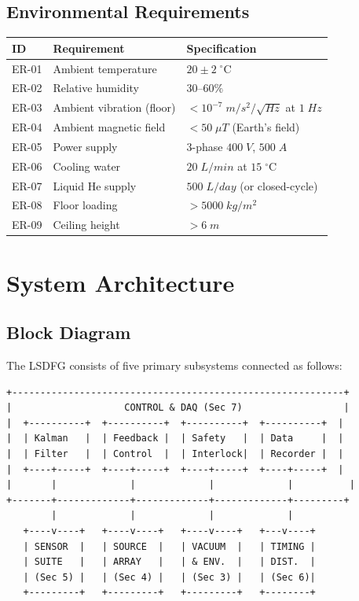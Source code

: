 \documentclass[11pt,a4paper]{article}
\begin{document}
\subsection{Environmental Requirements}

\begin{longtable}{p{}p{}p{}}
\toprule
\textbf{ID} & \textbf{Requirement} & \textbf{Specification} \\
\midrule
\endhead
ER-01 & Ambient temperature & $20 \pm 2\;^\circ$C \\
ER-02 & Relative humidity & $30$--$60\%$ \\
ER-03 & Ambient vibration (floor) & $< 10^{-7}\;\si{m/s^2/\sqrt{Hz}}$
at $1\;\si{Hz}$ \\
ER-04 & Ambient magnetic field & $< 50\;\si{\mu T}$ (Earth's field) \\
ER-05 & Power supply & $3$-phase $400\;\si{V}$, $500\;\si{A}$ \\
ER-06 & Cooling water & $20\;\si{L/min}$ at $15\;^\circ$C \\
ER-07 & Liquid He supply & $500\;\si{L/day}$ (or closed-cycle) \\
ER-08 & Floor loading & $> 5000\;\si{kg/m^2}$ \\
ER-09 & Ceiling height & $> 6\;\si{m}$ \\
\bottomrule
\end{longtable}

\section{System Architecture}

\subsection{Block Diagram}

The LSDFG consists of five primary subsystems connected as follows:

\begin{tcolorbox}[colback=blue!3, colframe=blue!50!black,
title=System Architecture Block Diagram]
\begin{verbatim}
+-----------------------------------------------------------+
|                    CONTROL & DAQ (Sec 7)                  |
|  +----------+  +----------+  +----------+  +----------+  |
|  | Kalman   |  | Feedback |  | Safety   |  | Data     |  |
|  | Filter   |  | Control  |  | Interlock|  | Recorder |  |
|  +----+-----+  +----+-----+  +----+-----+  +----+-----+  |
|       |             |             |             |          |
+-------+-------------+-------------+-------------+---------+
        |             |             |             |
   +----v----+   +----v----+   +----v----+   +---v----+
   | SENSOR  |   | SOURCE  |   | VACUUM  |   | TIMING |
   | SUITE   |   | ARRAY   |   | & ENV.  |   | DIST.  |
   | (Sec 5) |   | (Sec 4) |   | (Sec 3) |   | (Sec 6)|
   +---------+   +---------+   +---------+   +--------+
\end{verbatim}
\end{tcolorbox}
\end{document}
